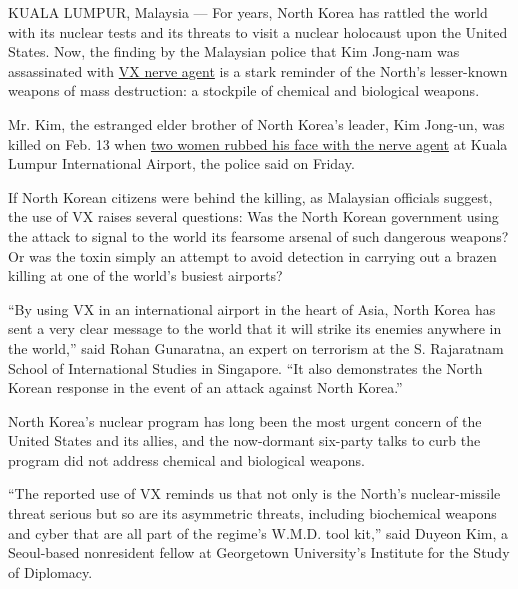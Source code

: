 KUALA LUMPUR, Malaysia --- For years, North Korea has rattled the world
with its nuclear tests and its threats to visit a nuclear holocaust upon
the United States. Now, the finding by the Malaysian police that Kim
Jong-nam was assassinated with
\href{https://www.nytimes.com/2017/02/24/world/asia/vx-nerve-agent-kim-jong-nam.html?rref=collection\%2Fsectioncollection\%2Fasia\&action=click\&contentCollection=asia\&region=stream\&module=stream_unit\&version=latest\&contentPlacement=5\&pgtype=sectionfront}{VX
nerve agent} is a stark reminder of the North's lesser-known weapons of
mass destruction: a stockpile of chemical and biological weapons.

Mr. Kim, the estranged elder brother of North Korea's leader, Kim
Jong-un, was killed on Feb. 13 when
\href{https://www.nytimes.com/2017/02/22/world/asia/kim-jong-nam-assassination-korea-malaysia.html?rref=collection\%2Fsectioncollection\%2Fasia\&action=click\&contentCollection=asia\&region=stream\&module=stream_unit\&version=latest\&contentPlacement=6\&pgtype=sectionfront}{two
women rubbed his face with the nerve agent} at Kuala Lumpur
International Airport, the police said on Friday.

If North Korean citizens were behind the killing, as Malaysian officials
suggest, the use of VX raises several questions: Was the North Korean
government using the attack to signal to the world its fearsome arsenal
of such dangerous weapons? Or was the toxin simply an attempt to avoid
detection in carrying out a brazen killing at one of the world's busiest
airports?

``By using VX in an international airport in the heart of Asia, North
Korea has sent a very clear message to the world that it will strike its
enemies anywhere in the world,'' said Rohan Gunaratna, an expert on
terrorism at the S. Rajaratnam School of International Studies in
Singapore. ``It also demonstrates the North Korean response in the event
of an attack against North Korea.''

North Korea's nuclear program has long been the most urgent concern of
the United States and its allies, and the now-dormant six-party talks to
curb the program did not address chemical and biological weapons.

``The reported use of VX reminds us that not only is the North's
nuclear-missile threat serious but so are its asymmetric threats,
including biochemical weapons and cyber that are all part of the
regime's W.M.D. tool kit,'' said Duyeon Kim, a Seoul-based nonresident
fellow at Georgetown University's Institute for the Study of Diplomacy.

